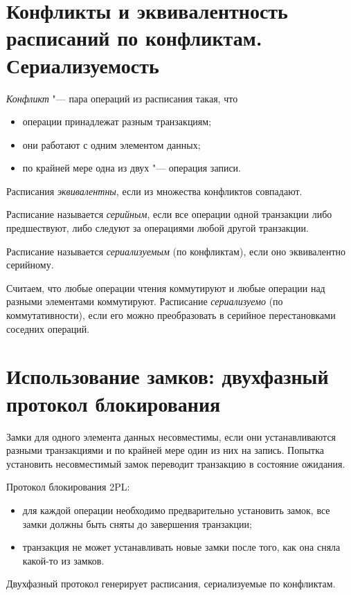 \section{Конфликты и эквивалентность расписаний по конфликтам. Сериализуемость}

\begin{definition}
	\emph{Конфликт} "--- пара операций из расписания такая, что
	\begin{itemize}
		\item операции принадлежат разным транзакциям;
		\item они работают с одним элементом данных;
		\item по крайней мере одна из двух "--- операция записи.
	\end{itemize}
\end{definition}

\begin{definition}
	Расписания \emph{эквивалентны}, если из множества конфликтов совпадают.
\end{definition}

\begin{definition}
	Расписание называется \emph{серийным}, если все операции одной транзакции либо предшествуют, либо следуют за операциями любой другой транзакции.
\end{definition}

\begin{definition}
	Расписание называется \emph{сериализуемым} (по конфликтам), если оно эквивалентно серийному.
\end{definition}

\begin{definition}
	Считаем, что любые операции чтения коммутируют и любые операции над разными элементами коммутируют.
	Расписание \emph{сериализуемо} (по коммутативности), если его можно преобразовать в серийное перестановками соседних операций.
\end{definition}

\section{Использование замков: двухфазный протокол блокирования}

Замки для одного элемента данных несовместимы, если они устанавливаются разными транзакциями и по крайней мере один из них на запись.
Попытка установить несовместимый замок переводит транзакцию в состояние ожидания.

Протокол блокирования 2PL:
\begin{itemize}
	\item для каждой операции необходимо предварительно установить замок, все замки должны быть сняты до завершения транзакции;
	\item транзакция не может устанавливать новые замки после того, как она сняла какой-то из замков.
\end{itemize}
Двухфазный протокол генерирует расписания, сериализуемые по конфликтам.

